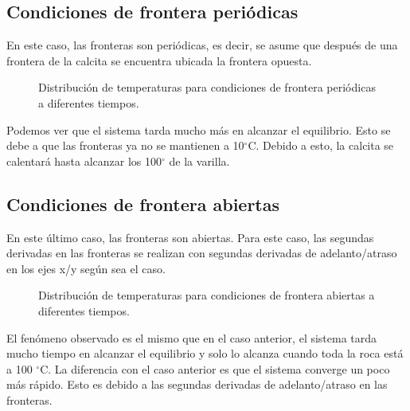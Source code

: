 \documentclass{article}
\begin{document}
\subsection*{Condiciones de frontera periódicas}
En este caso, las fronteras son periódicas, es decir, se asume que después de una frontera de la calcita se encuentra ubicada la frontera opuesta.
\begin{figure}[H]
    \centering
    \label{fig:my_label}
\end{figure}
\begin{figure}[H]
    \centering 
   \caption{Distribución de temperaturas para condiciones de frontera periódicas a diferentes tiempos.}
    \label{fig:my_label}
\end{figure}

Podemos ver que el sistema tarda mucho más en alcanzar el equilibrio. Esto se debe a que las fronteras ya no se mantienen a 10$^\circ$C. Debido a esto, la calcita se calentará hasta alcanzar los 100$^\circ$ de la varilla.

\subsection*{Condiciones de frontera abiertas}
En este último caso, las fronteras son abiertas. Para este caso, las segundas derivadas en las fronteras se realizan con segundas derivadas de adelanto/atraso en los ejes x/y según sea el caso.
\begin{figure}[H]
    \centering
    \label{fig:my_label}
\end{figure}
\begin{figure}[H]
    \centering 
   \caption{Distribución de temperaturas para condiciones de frontera abiertas a diferentes tiempos.}
    \label{fig:my_label}
\end{figure}

El fenómeno observado es el mismo que en el caso anterior, el sistema tarda mucho tiempo en alcanzar el equilibrio y solo lo alcanza cuando toda la roca está a 100 $^\circ$C. La diferencia con el caso anterior es que el sistema converge un poco más rápido. Esto es debido a las segundas derivadas de adelanto/atraso en las fronteras.
\end{document}
